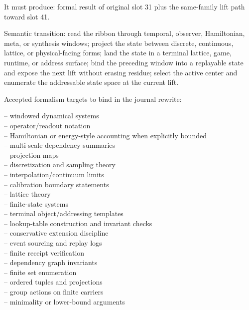 \documentclass[11pt]{article}
\begin{document}
It must produce: formal result of original slot 31 plus the same-family lift path toward slot 41.

Semantic transition: read the ribbon through temporal, observer, Hamiltonian, meta, or synthesis windows; project the state between discrete, continuous, lattice, or physical-facing forms; land the state in a terminal lattice, game, runtime, or address surface; bind the preceding window into a replayable state and expose the next lift without erasing residue; select the active center and enumerate the addressable state space at the current lift.

Accepted formalism targets to bind in the journal rewrite:

\noindent{}-- windowed dynamical systems\\
\noindent{}-- operator/readout notation\\
\noindent{}-- Hamiltonian or energy-style accounting when explicitly bounded\\
\noindent{}-- multi-scale dependency summaries\\
\noindent{}-- projection maps\\
\noindent{}-- discretization and sampling theory\\
\noindent{}-- interpolation/continuum limits\\
\noindent{}-- calibration boundary statements\\
\noindent{}-- lattice theory\\
\noindent{}-- finite-state systems\\
\noindent{}-- terminal object/addressing templates\\
\noindent{}-- lookup-table construction and invariant checks\\
\noindent{}-- conservative extension discipline\\
\noindent{}-- event sourcing and replay logs\\
\noindent{}-- finite receipt verification\\
\noindent{}-- dependency graph invariants\\
\noindent{}-- finite set enumeration\\
\noindent{}-- ordered tuples and projections\\
\noindent{}-- group actions on finite carriers\\
\noindent{}-- minimality or lower-bound arguments\\
\end{document}
